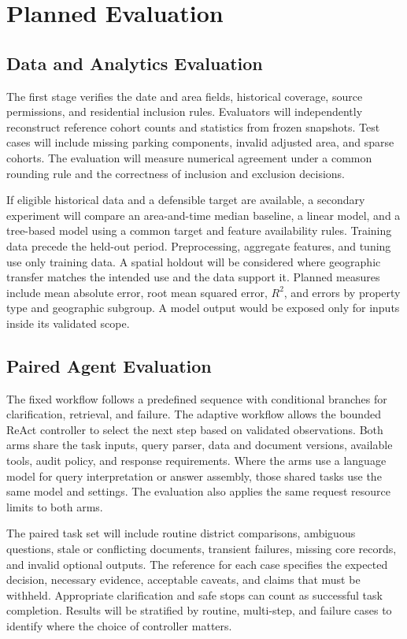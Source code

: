 \documentclass[conference]{IEEEtran}
\begin{document}
\section{Planned Evaluation}
\label{sec:evaluation}
\subsection{Data and Analytics Evaluation}
The first stage verifies the date and area fields, historical coverage, source permissions, and residential inclusion rules. Evaluators will independently reconstruct reference cohort counts and statistics from frozen snapshots. Test cases will include missing parking components, invalid adjusted area, and sparse cohorts. The evaluation will measure numerical agreement under a common rounding rule and the correctness of inclusion and exclusion decisions.

If eligible historical data and a defensible target are available, a secondary experiment will compare an area-and-time median baseline, a linear model, and a tree-based model using a common target and feature availability rules. Training data precede the held-out period. Preprocessing, aggregate features, and tuning use only training data. A spatial holdout will be considered where geographic transfer matches the intended use and the data support it. Planned measures include mean absolute error, root mean squared error, \(R^2\), and errors by property type and geographic subgroup. A model output would be exposed only for inputs inside its validated scope.

\subsection{Paired Agent Evaluation}
The fixed workflow follows a predefined sequence with conditional branches for clarification, retrieval, and failure. The adaptive workflow allows the bounded ReAct controller to select the next step based on validated observations. Both arms share the task inputs, query parser, data and document versions, available tools, audit policy, and response requirements. Where the arms use a language model for query interpretation or answer assembly, those shared tasks use the same model and settings. The evaluation also applies the same request resource limits to both arms.

The paired task set will include routine district comparisons, ambiguous questions, stale or conflicting documents, transient failures, missing core records, and invalid optional outputs. The reference for each case specifies the expected decision, necessary evidence, acceptable caveats, and claims that must be withheld. Appropriate clarification and safe stops can count as successful task completion. Results will be stratified by routine, multi-step, and failure cases to identify where the choice of controller matters.
\end{document}
